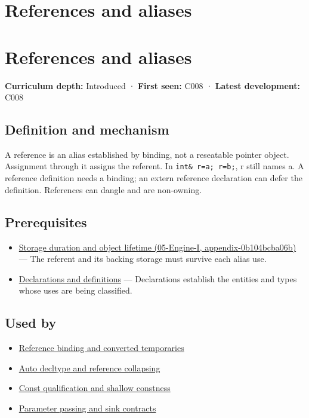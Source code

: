 \hypertarget{appendix-d6d562ca9fbb}{}
\section*{References and aliases}
\section{References and aliases}\label{appendix-d6d562ca9fbb-references-and-aliases}

\textbf{Curriculum depth:} Introduced · \textbf{First seen:} C008 · \textbf{Latest development:} C008

\subsection{Definition and mechanism}\label{appendix-d6d562ca9fbb-definition-and-mechanism}

A reference is an alias established by binding, not a reseatable pointer object. Assignment through it assigns the referent. In \texttt{int\&\ r=a;\ r=b;}, r still names a. A reference definition needs a binding; an extern reference declaration can defer the definition. References can dangle and are non-owning.

\subsection{Prerequisites}\label{appendix-d6d562ca9fbb-prerequisites}

\begin{itemize}
\tightlist
\item
  \href{../05-Engine-I/main.pdf\#nameddest=appendix-0b104bcba06b}{Storage duration and object lifetime (05-Engine-I, appendix-0b104bcba06b)} --- The referent and its backing storage must survive each alias use.
\item
  \hyperref[appendix-2e4d494c2d94]{Declarations and definitions} --- Declarations establish the entities and types whose uses are being classified.
\end{itemize}

\subsection{Used by}\label{appendix-d6d562ca9fbb-used-by}

\begin{itemize}
\tightlist
\item
  \hyperref[appendix-37856d997bb0]{Reference binding and converted temporaries}
\item
  \hyperref[appendix-5d4252a42886]{Auto decltype and reference collapsing}
\item
  \hyperref[appendix-c25d60fed375]{Const qualification and shallow constness}
\item
  \hyperref[appendix-d5908f75721f]{Parameter passing and sink contracts}
\end{itemize}

